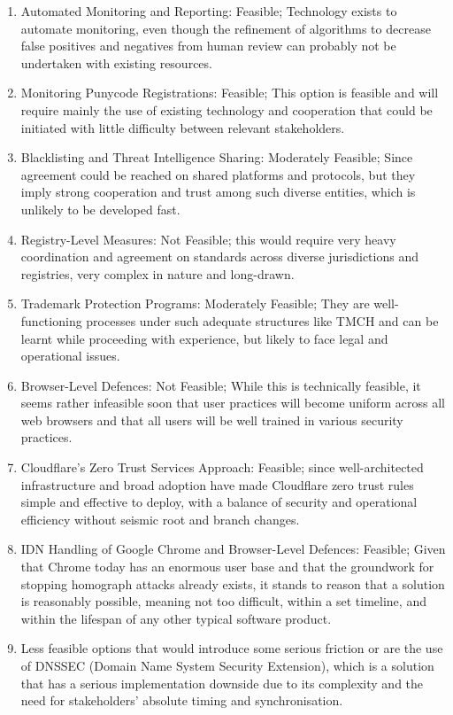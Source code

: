  \begin{enumerate}
  \item Automated Monitoring and Reporting: Feasible; Technology exists to automate monitoring, even though the refinement of algorithms to decrease false positives and negatives from human review can probably not be undertaken with existing resources.
  \item  Monitoring Punycode Registrations: Feasible; This option is feasible and will require mainly the use of existing technology and cooperation that could be initiated with little difficulty between relevant stakeholders.
  \item Blacklisting and Threat Intelligence Sharing: Moderately Feasible; Since agreement could be reached on shared platforms and protocols, but they imply strong cooperation and trust among such diverse entities, which is unlikely to be developed fast.
  \item Registry-Level Measures: Not Feasible; this would require very heavy coordination and agreement on standards across diverse jurisdictions and registries, very complex in nature and long-drawn.
  \item Trademark Protection Programs: Moderately Feasible; They are well-functioning processes under such adequate structures like TMCH and can be learnt while proceeding with experience, but likely to face legal and operational issues.
  \item  Browser-Level Defences: Not Feasible; While this is technically feasible, it seems rather infeasible soon that user practices will become uniform across all web browsers and that all users will be well trained in various security practices.
  \item Cloudflare's Zero Trust Services Approach: Feasible; since well-architected infrastructure and broad adoption have made Cloudflare zero trust rules simple and effective to deploy, with a balance of security and operational efficiency without seismic root and branch changes.
  \item IDN Handling of Google Chrome and Browser-Level Defences: Feasible; Given that Chrome today has an enormous user base and that the groundwork for stopping homograph attacks already exists, it stands to reason that a solution is reasonably possible, meaning not too difficult, within a set timeline, and within the lifespan of any other typical software product.
  \item Less feasible options that would introduce some serious friction or are the use of DNSSEC (Domain Name System Security Extension), which is a solution that has a serious implementation downside due to its complexity and the need for stakeholders' absolute timing and synchronisation.
  
\end{enumerate}


